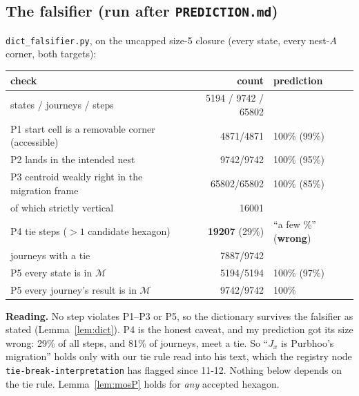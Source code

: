 \documentclass[11pt]{article}
\theoremstyle{definition}\newtheorem{definition}[theorem]{Definition}\newtheorem{remark}[theorem]{Remark}
\newcommand{\M}{\mathcal M}\newcommand{\F}{\mathcal F}
\begin{document}
\subsection{The falsifier (run after \texttt{PREDICTION.md})}
\texttt{dict\_falsifier.py}, on the uncapped size-5 closure (every state, every nest-$A$ corner, both targets):
\begin{center}\small\begin{tabular}{lrl}\toprule
check & count & prediction\\\midrule
states / journeys / steps & 5194 / 9742 / 65802 & \\
P1 start cell is a removable corner (accessible) & 4871/4871 & 100\% (99\%)\\
P2 lands in the intended nest & 9742/9742 & 100\% (95\%)\\
P3 centroid weakly right in the migration frame & 65802/65802 & 100\% (85\%)\\
\quad of which strictly vertical & 16001 & \\
P4 tie steps ($>1$ candidate hexagon) & \textbf{19207} (29\%) & ``a few \%'' (\textbf{wrong})\\
\quad journeys with a tie & 7887/9742 & \\
P5 every state is in $\M$ & 5194/5194 & 100\% (97\%)\\
P5 every journey's result is in $\M$ & 9742/9742 & 100\%\\
\bottomrule\end{tabular}\end{center}
\textbf{Reading.} No step violates P1--P3 or P5, so the dictionary survives the falsifier as stated (Lemma~\ref{lem:dict}). P4 is the honest caveat, and my prediction got its size wrong: 29\% of all steps, and 81\% of journeys, meet a tie. So ``$J_x$ is Purbhoo's migration'' holds only with our tie rule read into his text, which the registry node \texttt{tie-break-interpretation} has flagged since 11-12. Nothing below depends on the tie rule. Lemma~\ref{lem:mosP} holds for \emph{any} accepted hexagon.
\end{document}
